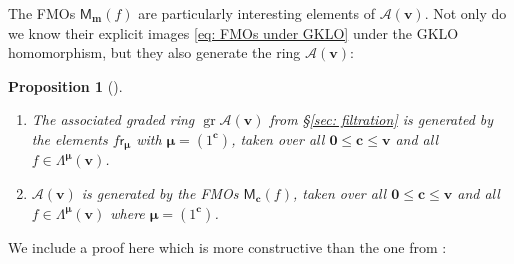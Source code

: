 \documentclass[11pt,reqno]{amsart}
\renewcommand{\mathbf}{\mathbold}
\numberwithin{equation}{section}
\newtheorem{Proposition}[equation]{Proposition}
\theoremstyle{definition}
\newcommand{\cA}{\mathcal{A}}
\newcommand{\bc}{\mathbf{c}}
\newcommand{\bm}{\mathbf{m}}
\newcommand{\bv}{\mathbf{v}}
\DeclareMathOperator{\gr}{gr}
\renewcommand{\bv}{\mathbf{v}} %
\newcommand{\M}{\mathsf{M}}
\newcommand{\sfr}{{\mathsf{r}}}
\newcommand{\GT}{\Lambda}
\newcommand{\bmu}{{\boldsymbol{\mu}}}
\newcommand{\qzast}{\cA}
\begin{document}
The FMOs $\M_\bm(f)$ are particularly interesting elements of $\qzast(\bv)$. Not only do we know their explicit images \eqref{eq: FMOs under GKLO} under the GKLO homomorphism, but they also generate the ring $\qzast(\bv)$: 
\begin{Proposition}[\mbox{\cite[Proposition 3.1]{Weekes}}]
\label{generation by FMOs}
\mbox{}

\begin{enumerate}[label=(\alph*),topsep=3pt,itemsep = 5pt]
\item The associated graded ring $\gr \qzast(\bv)$ from \S \ref{sec: filtration} is generated by the elements $f \sfr_{\bmu}$ with $\bmu = (1^{\bc})$, taken over all $\mathbf{0} \leq \bc\leq \bv$ and all $f \in \GT^{\bmu}(\bv)$.

\item $\qzast(\bv)$ is generated by the FMOs $\M_\bc(f)$, taken over all $\mathbf{0} \leq \bc\leq \bv$ and all $f \in \GT^{\bmu}(\bv)$  where $\bmu = (1^{\bc})$.
\end{enumerate}
\end{Proposition}
We include a proof here which is more constructive than the one from \cite{Weekes}:
\end{document}
